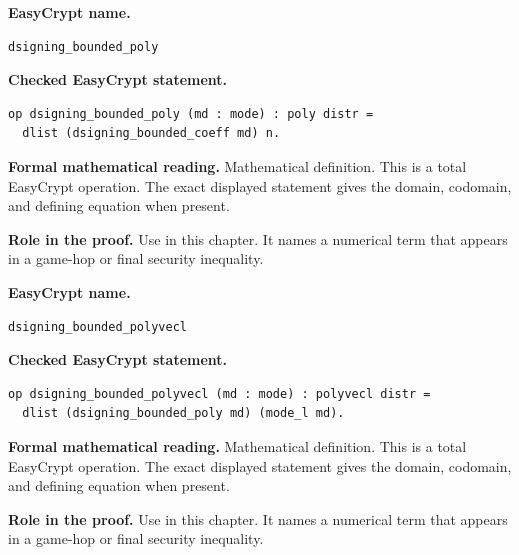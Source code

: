\begin{formaldefinition}
\noindent\textbf{EasyCrypt name.}
\begin{lstlisting}[language=EasyCrypt,basicstyle=\ttfamily\scriptsize]
dsigning_bounded_poly
\end{lstlisting}
\noindent\textbf{Checked EasyCrypt statement.}
\begin{lstlisting}[language=EasyCrypt,basicstyle=\ttfamily\scriptsize]
op dsigning_bounded_poly (md : mode) : poly distr =
  dlist (dsigning_bounded_coeff md) n.
\end{lstlisting}
\noindent\textbf{Formal mathematical reading.}
Mathematical definition. This is a total EasyCrypt operation.  The exact displayed statement gives the domain, codomain, and defining equation when present.

\noindent\textbf{Role in the proof.}
Use in this chapter. It names a numerical term that appears in a game-hop or final security inequality.

\end{formaldefinition}

\begin{formaldefinition}
\noindent\textbf{EasyCrypt name.}
\begin{lstlisting}[language=EasyCrypt,basicstyle=\ttfamily\scriptsize]
dsigning_bounded_polyvecl
\end{lstlisting}
\noindent\textbf{Checked EasyCrypt statement.}
\begin{lstlisting}[language=EasyCrypt,basicstyle=\ttfamily\scriptsize]
op dsigning_bounded_polyvecl (md : mode) : polyvecl distr =
  dlist (dsigning_bounded_poly md) (mode_l md).
\end{lstlisting}
\noindent\textbf{Formal mathematical reading.}
Mathematical definition. This is a total EasyCrypt operation.  The exact displayed statement gives the domain, codomain, and defining equation when present.

\noindent\textbf{Role in the proof.}
Use in this chapter. It names a numerical term that appears in a game-hop or final security inequality.

\end{formaldefinition}

